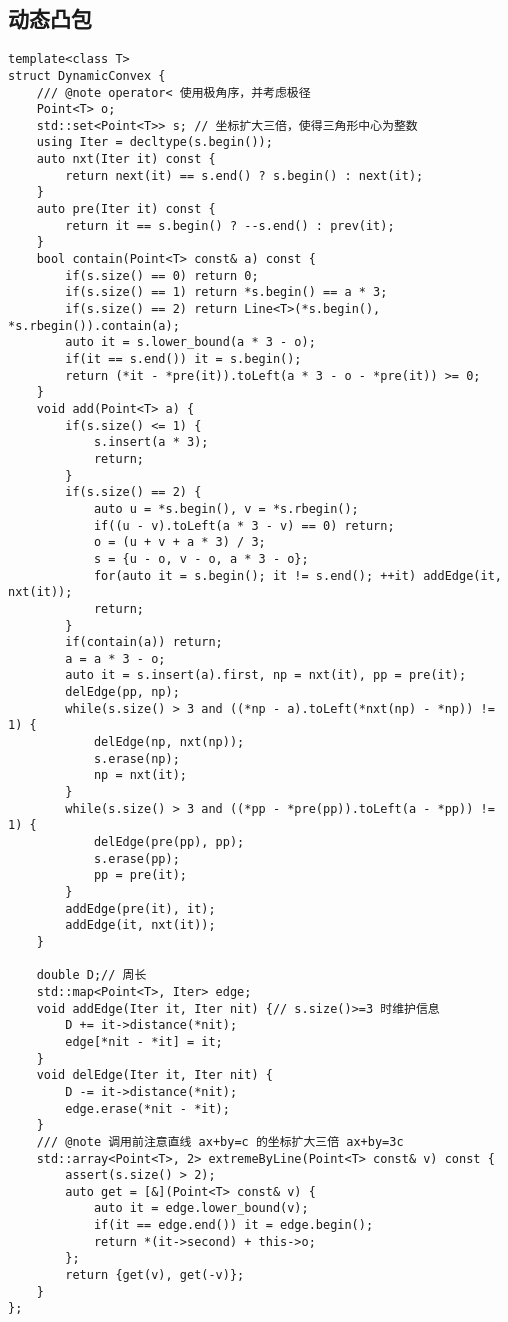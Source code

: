 \subsection{动态凸包}
\begin{lstlisting}
template<class T>
struct DynamicConvex {
    /// @note operator< 使用极角序，并考虑极径
    Point<T> o;
    std::set<Point<T>> s; // 坐标扩大三倍，使得三角形中心为整数
    using Iter = decltype(s.begin());
    auto nxt(Iter it) const {
        return next(it) == s.end() ? s.begin() : next(it);
    }
    auto pre(Iter it) const {
        return it == s.begin() ? --s.end() : prev(it);
    }
    bool contain(Point<T> const& a) const {
        if(s.size() == 0) return 0;
        if(s.size() == 1) return *s.begin() == a * 3;
        if(s.size() == 2) return Line<T>(*s.begin(), *s.rbegin()).contain(a);
        auto it = s.lower_bound(a * 3 - o);
        if(it == s.end()) it = s.begin();
        return (*it - *pre(it)).toLeft(a * 3 - o - *pre(it)) >= 0;
    }
    void add(Point<T> a) {
        if(s.size() <= 1) {
            s.insert(a * 3);
            return;
        }
        if(s.size() == 2) {
            auto u = *s.begin(), v = *s.rbegin();
            if((u - v).toLeft(a * 3 - v) == 0) return;
            o = (u + v + a * 3) / 3;
            s = {u - o, v - o, a * 3 - o};
            for(auto it = s.begin(); it != s.end(); ++it) addEdge(it, nxt(it));
            return;
        }
        if(contain(a)) return;
        a = a * 3 - o;
        auto it = s.insert(a).first, np = nxt(it), pp = pre(it);
        delEdge(pp, np);
        while(s.size() > 3 and ((*np - a).toLeft(*nxt(np) - *np)) != 1) {
            delEdge(np, nxt(np));
            s.erase(np);
            np = nxt(it);
        }
        while(s.size() > 3 and ((*pp - *pre(pp)).toLeft(a - *pp)) != 1) {
            delEdge(pre(pp), pp);
            s.erase(pp);
            pp = pre(it);
        }
        addEdge(pre(it), it);
        addEdge(it, nxt(it));
    }

    double D;// 周长
    std::map<Point<T>, Iter> edge;
    void addEdge(Iter it, Iter nit) {// s.size()>=3 时维护信息
        D += it->distance(*nit);
        edge[*nit - *it] = it;
    }
    void delEdge(Iter it, Iter nit) {
        D -= it->distance(*nit);
        edge.erase(*nit - *it);
    }
    /// @note 调用前注意直线 ax+by=c 的坐标扩大三倍 ax+by=3c
    std::array<Point<T>, 2> extremeByLine(Point<T> const& v) const {
        assert(s.size() > 2);
        auto get = [&](Point<T> const& v) {
            auto it = edge.lower_bound(v);
            if(it == edge.end()) it = edge.begin();
            return *(it->second) + this->o;
        };
        return {get(v), get(-v)};
    }
};
\end{lstlisting}

